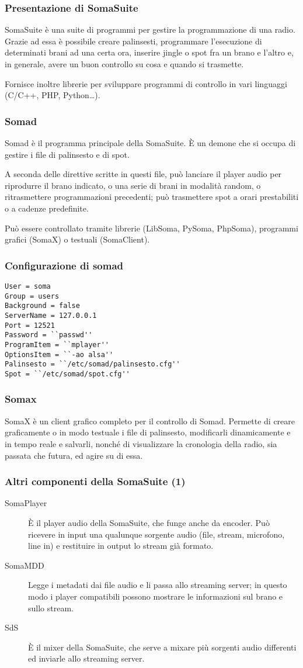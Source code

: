 \documentclass{beamer}
\begin{document}
\begin{frame}\frametitle{Presentazione di SomaSuite}
SomaSuite è una suite di programmi per gestire la programmazione di
una radio. Grazie ad essa è possibile creare palinsesti, programmare
l'esecuzione di determinati brani ad una certa ora, inserire jingle o
spot fra un brano e l'altro e, in generale, avere un buon controllo su
cosa e quando si trasmette.

Fornisce inoltre librerie per sviluppare programmi di controllo in
vari linguaggi (C/C++, PHP, Python{\ldots}).
\end{frame}

\begin{frame}\frametitle{Somad}
Somad è il programma principale della SomaSuite. È un demone che si
occupa di gestire i file di palinsesto e di spot.

A seconda delle direttive scritte in questi file, può lanciare il
player audio per riprodurre il brano indicato, o una serie di brani in
modalità random, o ritrasmettere programmazioni precedenti; può
trasmettere spot a orari prestabiliti o a cadenze predefinite.

Può essere controllato tramite librerie (LibSoma, PySoma, PhpSoma),
programmi grafici (SomaX) o testuali (SomaClient).
\end{frame}

\begin{frame}
\frametitle{Configurazione di somad}
\begin{verbatim}
User = soma 
Group = users
Background = false
ServerName = 127.0.0.1
Port = 12521
Password = ``passwd''
ProgramItem = ``mplayer''
OptionsItem = ``-ao alsa''
Palinsesto = ``/etc/somad/palinsesto.cfg''
Spot = ``/etc/somad/spot.cfg''
\end{verbatim}
\end{frame}

\begin{frame}\frametitle{Somax}
SomaX è un client grafico completo per il controllo di Somad. Permette
di creare graficamente o in modo testuale i file di palinsesto,
modificarli dinamicamente e in tempo reale e salvarli, nonché di
visualizzare la cronologia della radio, sia passata che futura, ed
agire su di essa.
\end{frame}

\begin{frame}\frametitle{Altri componenti della SomaSuite (1)}
\begin{description}
\item[SomaPlayer] È il player audio della SomaSuite, che funge anche
da encoder. Può ricevere in input una qualunque sorgente audio (file,
stream, microfono, line in) e restituire in output lo stream già
formato.
\item[SomaMDD] Legge i metadati dai file audio e li passa allo
streaming server; in questo modo i player compatibili possono mostrare
le informazioni sul brano e sullo stream.
\item[SdS] È il mixer della SomaSuite, che serve a mixare più sorgenti
audio differenti ed inviarle allo streaming server.
\end{description}
\end{frame}
\end{document}
